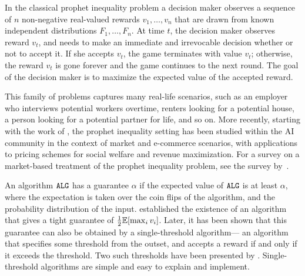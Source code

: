 

In the classical prophet inequality problem a decision maker observes a sequence of $n$ non-negative real-valued rewards $v_1, \ldots, v_n$ that are drawn from known independent distributions $F_1,\ldots ,F_n$. 
At time $t$, the decision maker observes reward $v_t$, and needs to make an immediate and irrevocable decision whether or not to accept it. If she accepts $v_t$, the game terminates with value $v_t$; otherwise, the reward $v_t$ is gone forever and the game continues to the next round.
The goal of the decision maker is to maximize the expected value of the accepted reward.

This family of problems captures many real-life scenarios, such as an employer who interviews potential workers overtime, renters looking for a potential house, a person looking for a potential partner for life, and so on. More recently, starting with the work of \citet{HajiaghayiKS07}, the prophet inequality setting has been studied within the AI community in the context of market and e-commerce scenarios, with applications to pricing schemes for social welfare and revenue maximization. For a survey on a market-based treatment of the prophet inequality problem, see the survey by~\citet{lucier2017economic}.  


An algorithm $\texttt{ALG}$ has a guarantee $\alpha$ if  the expected value of   $\texttt{ALG}$ is at least $\alpha$, where the expectation is taken over the coin flips of the algorithm, and the probability distribution of the input. 
\citet{KrengelS77,krengel1978semiamarts} established the existence of an algorithm that gives a tight guarantee of $\frac{1}{2}\mathbb{E}[\max_i v_i]$.  
Later, it has been shown that this guarantee can also be obtained by a single-threshold algorithm--- an algorithm that specifies some threshold from the outset, and accepts a reward if and only if it exceeds the threshold. 
Two such thresholds have been presented by \citet{samuel1984comparison,KleinbergW19}.  
Single-threshold algorithms are simple and easy to explain and implement. 

